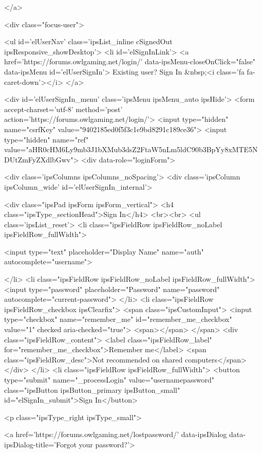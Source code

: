	
</a>
									
										<div class="focus-user">

	<ul id='elUserNav' class='ipsList_inline cSignedOut ipsResponsive_showDesktop'>
		<li id='elSignInLink'>
			<a href='https://forums.owlgaming.net/login/' data-ipsMenu-closeOnClick="false" data-ipsMenu id='elUserSignIn'>
				Existing user? Sign In &nbsp;<i class='fa fa-caret-down'></i>
			</a>
			
<div id='elUserSignIn_menu' class='ipsMenu ipsMenu_auto ipsHide'>
	<form accept-charset='utf-8' method='post' action='https://forums.owlgaming.net/login/'>
		<input type="hidden" name="csrfKey" value="9402185ed0f5f3c1e9bd8291c189ce36">
		<input type="hidden" name="ref" value="aHR0cHM6Ly9mb3J1bXMub3dsZ2FtaW5nLm5ldC90b3BpYy8xMTE5NDUtZmFyZXdlbGwv">
		<div data-role="loginForm">
			
			
			
				<div class='ipsColumns ipsColumns_noSpacing'>
					<div class='ipsColumn ipsColumn_wide' id='elUserSignIn_internal'>
						
<div class="ipsPad ipsForm ipsForm_vertical">
	<h4 class="ipsType_sectionHead">Sign In</h4>
	<br><br>
	<ul class='ipsList_reset'>
		<li class="ipsFieldRow ipsFieldRow_noLabel ipsFieldRow_fullWidth">
			
			
				<input type="text" placeholder="Display Name" name="auth" autocomplete="username">
			
		</li>
		<li class="ipsFieldRow ipsFieldRow_noLabel ipsFieldRow_fullWidth">
			<input type="password" placeholder="Password" name="password" autocomplete="current-password">
		</li>
		<li class="ipsFieldRow ipsFieldRow_checkbox ipsClearfix">
			<span class="ipsCustomInput">
				<input type="checkbox" name="remember_me" id="remember_me_checkbox" value="1" checked aria-checked="true">
				<span></span>
			</span>
			<div class="ipsFieldRow_content">
				<label class="ipsFieldRow_label" for="remember_me_checkbox">Remember me</label>
				<span class="ipsFieldRow_desc">Not recommended on shared computers</span>
			</div>
		</li>
		<li class="ipsFieldRow ipsFieldRow_fullWidth">
			<button type="submit" name="_processLogin" value="usernamepassword" class="ipsButton ipsButton_primary ipsButton_small" id="elSignIn_submit">Sign In</button>
			
				<p class="ipsType_right ipsType_small">
					
						<a href='https://forums.owlgaming.net/lostpassword/' data-ipsDialog data-ipsDialog-title='Forgot your password?'>
					

